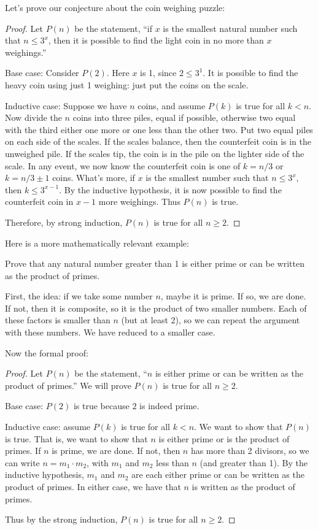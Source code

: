 \documentclass[12pt]{article}
\begin{document}
Let's prove our conjecture about the coin weighing puzzle:

\begin{proof}
	Let $P(n)$ be the statement, ``if $x$ is the smallest natural number such that $n \le 3^x$, then it is possible to find the light coin in no more than $x$ weighings.''

	Base case: Consider $P(2)$.  Here $x$ is 1, since $2 \le 3^1$.  It is possible to find the heavy coin using just 1 weighing: just put the coins on the scale.

	Inductive case: Suppose we have $n$ coins, and assume $P(k)$ is true for all $k < n$.  Now divide the $n$ coins into three piles, equal if possible, otherwise two equal with the third either one more or one less than the other two.  Put two equal piles on each side of the scales.  If the scales balance, then the counterfeit coin is in the unweighed pile.  If the scales tip, the coin is in the pile on the lighter side of the scale.  In any event, we now know the counterfeit coin is one of $k = n/3$ or $k = n/3\pm 1$ coins.  What's more, if $x$ is the smallest number such that $n \le 3^x$, then $k \le 3^{x-1}$.  By the inductive hypothesis, it is now possible to find the counterfeit coin in $x-1$ more weighings.  Thus $P(n)$ is true.

	Therefore, by strong induction, $P(n)$ is true for all $n \ge 2$.
\end{proof}

Here is a more mathematically relevant example:

\begin{example}
	Prove that any natural number greater than 1 is either prime or can be written as the product of primes.
	\begin{solution}
		First, the idea: if we take some number $n$, maybe it is prime.  If so, we are done.  If not, then it is composite, so it is the product of two smaller numbers.  Each of these factors is smaller than $n$ (but at least 2), so we can repeat the argument with these numbers.  We have reduced to a smaller case.

		Now the formal proof:
		\begin{proof}
			Let $P(n)$ be the statement, ``$n$ is either prime or can be written as the product of primes.''  We will prove $P(n)$ is true for all $n \ge 2$.

			Base case: $P(2)$ is true because $2$ is indeed prime.

			Inductive case: assume $P(k)$ is true for all $k < n$.  We want to show that $P(n)$ is true.  That is, we want to show that $n$ is either prime or is the product of primes.  If $n$ is prime, we are done.  If not, then $n$ has more than 2 divisors, so we can write $n = m_1 \cdot m_2$, with $m_1$ and $m_2$ less than $n$ (and greater than 1).  By the inductive hypothesis, $m_1$ and $m_2$ are each either prime or can be written as the product of primes.  In either case, we have that $n$ is written as the product of primes.

			Thus by the strong induction, $P(n)$ is true for all $n \ge 2$.
		\end{proof}
	\end{solution}
\end{example}
\end{document}
